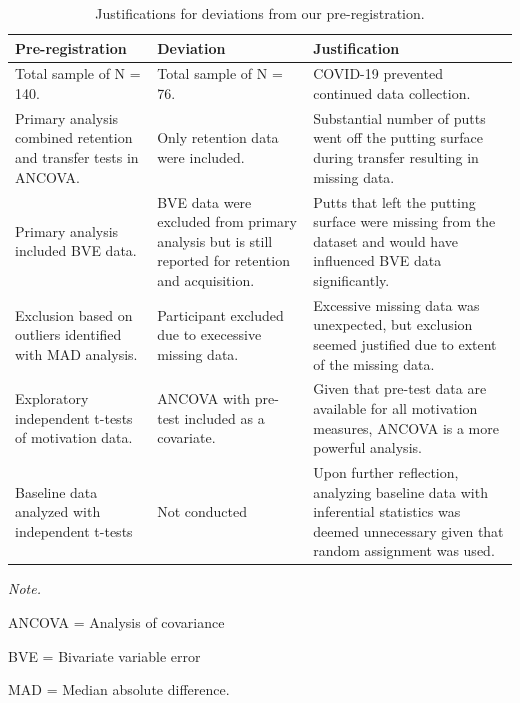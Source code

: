 \documentclass[
  english,
  man,floatsintext]{apa7}
\begin{document}
\begin{landscape}\begin{table}

\caption{\label{tab:table2}Justifications for deviations from our pre-registration.}
\fontsize{11}{13}\selectfont
\begin{threeparttable}
\begin{tabular}[t]{>{\raggedright\arraybackslash}p{14em}>{\raggedright\arraybackslash}p{16em}>{\raggedright\arraybackslash}p{25em}}
\toprule
Pre-registration & Deviation & Justification\\
\midrule
Total sample of N = 140. & Total sample of N = 76. & COVID-19 prevented continued data collection.\\
\addlinespace
Primary analysis combined retention and transfer tests in ANCOVA. & Only retention data were included. & Substantial number of putts went off the putting surface during transfer resulting in missing data.\\
\addlinespace
Primary analysis included BVE data. & BVE data were excluded from primary analysis but is still reported for retention and acquisition. & Putts that left the putting surface were missing from the dataset and would have influenced BVE data significantly.\\
\addlinespace
Exclusion based on outliers identified with MAD analysis. & Participant excluded due to execessive missing data. & Excessive missing data was unexpected, but exclusion seemed justified due to extent of the missing data.\\
\addlinespace
Exploratory independent t-tests of motivation data. & ANCOVA with pre-test included as a covariate. & Given that pre-test data are available for all motivation measures, ANCOVA is a more powerful analysis.\\
\addlinespace
Baseline data analyzed with independent t-tests & Not conducted & Upon further reflection, analyzing baseline data with inferential statistics was deemed unnecessary given that random assignment was used.\\
\bottomrule
\end{tabular}
\begin{tablenotes}
\item \textit{Note.} 
\item ANCOVA = Analysis of covariance
\item BVE = Bivariate variable error
\item MAD = Median absolute difference.
\end{tablenotes}
\end{threeparttable}
\end{table}
\end{landscape}
\end{document}

